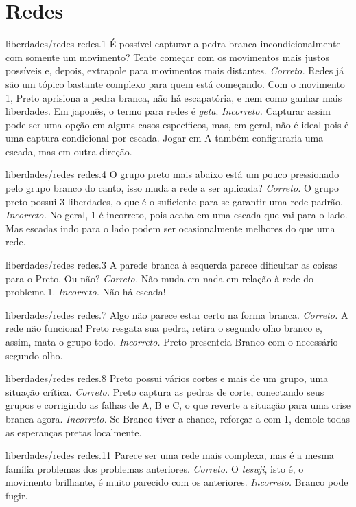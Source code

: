 \chapter{Redes}

\emptypage

\problemAnswerDiagram
  {liberdades/redes}
  {redes.1}
  {É possível capturar a pedra branca incondicionalmente com somente um movimento? Tente começar com os movimentos mais justos possíveis e, depois, extrapole para movimentos mais distantes.}
  {\emph{Correto.} Redes já são um tópico bastante complexo para quem está começando. Com o movimento 1, Preto aprisiona a pedra branca, não há escapatória, e nem como ganhar mais liberdades. Em japonês, o termo para redes é \emph{geta}.}
  {\emph{Incorreto.} Capturar assim pode ser uma opção em alguns casos específicos, mas, em geral, não é ideal pois é uma captura condicional por escada. Jogar em A também configuraria uma escada, mas em outra direção.}

\problemAnswerDiagram
  {liberdades/redes}
  {redes.4}
  {O grupo preto mais abaixo está um pouco pressionado pelo grupo branco do canto, isso muda a rede a ser aplicada?}
  {\emph{Correto.} O grupo preto possui 3 liberdades, o que é o suficiente para se garantir uma rede padrão.}
  {\emph{Incorreto.} No geral, 1 é incorreto, pois acaba em uma escada que vai para o lado. Mas escadas indo para o lado podem ser ocasionalmente melhores do que uma rede.}

\problemAnswerDiagram
  {liberdades/redes}
  {redes.3}
  {A parede branca à esquerda parece dificultar as coisas para o Preto. Ou não?}
  {\emph{Correto.} Não muda em nada em relação à rede do problema 1.}
  {\emph{Incorreto.} Não há escada!}

\problemAnswerDiagram
  {liberdades/redes}
  {redes.7}
  {Algo não parece estar certo na forma branca.}
  {\emph{Correto.} A rede não funciona! Preto resgata sua pedra, retira o segundo olho branco e, assim, mata o grupo todo.}
  {\emph{Incorreto.} Preto presenteia Branco com o necessário segundo olho.}

\problemAnswerDiagram
  {liberdades/redes}
  {redes.8}
  {Preto possui vários cortes e mais de um grupo, uma situação crítica.}
  {\emph{Correto.} Preto captura as pedras de corte, conectando seus grupos e corrigindo as falhas de A, B e C, o que reverte a situação para uma crise branca agora.}
  {\emph{Incorreto.} Se Branco tiver a chance, reforçar a com 1, demole todas as esperanças pretas localmente.}

\problemAnswerDiagram
  {liberdades/redes}
  {redes.11}
  {Parece ser uma rede mais complexa, mas é a mesma família problemas dos problemas anteriores.}
  {\emph{Correto.} O \emph{tesuji}, isto é, o movimento brilhante, é muito parecido com os anteriores.}
  {\emph{Incorreto.} Branco pode fugir.}

